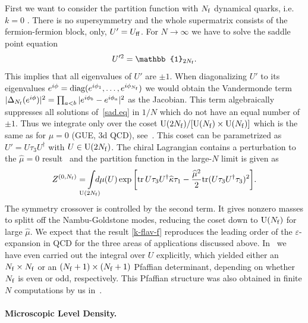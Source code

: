 \documentclass[aps,prl,reprint,graphicx,showpacs]{revtex4-1}
\newcommand{\tr}{\text{tr}}
\newcommand{\id}{\mathbb{1}}
\newcommand{\diag}{\text{diag}}
\newcommand{\U}{\text{U}}
\renewcommand{\epsilon}{\varepsilon}
\begin{document}
First we want to consider the partition function with $N_{\rm f}$ dynamical quarks, i.e. $k=0$ \cite{comm}. There is no supersymmetry and the whole supermatrix consists of the fermion-fermion block, only, $U'=U_{\rm ff}$. For $N\to\infty$ we have to solve the saddle point equation
\begin{equation}\label{sad.eq}
 U'^2=\id_{2N_{\rm f}}.
\end{equation}
This implies that all eigenvalues of $U'$ are $\pm1$. When diagonalizing $U'$ to its eigenvalues $e^{i \phi}=\diag(e^{i \phi_1},\ldots,e^{i \phi_{N_{\rm f}}})$ we would obtain the Vandermonde term $|\Delta_{N_{\rm f}}(e^{i \phi})|^2=\prod_{a<b}|e^{i \phi_b}-e^{i \phi_a}|^2$ as the Jacobian. This term algebraically suppresses all solutions of~\eqref{sad.eq} in $1/N$ which do not have an equal number of $\pm1$. Thus we integrate only over the coset ${\rm U}(2N_{\rm f})/[{\rm U}(N_{\rm f})\times {\rm U}(N_{\rm f})]$ which is the same as for $\mu=0$ (GUE, 3d QCD), see~\cite{Verbaarschot:1994ip}. This coset can be parametrized as $U'=U\tau_3 U^\dagger$ with $U\in{\rm U}(2N_{\rm f})$. The chiral Lagrangian contains a perturbation to the $\widehat{\mu}=0$ result~\cite{Verbaarschot:1994ip,Szabo:2005gi} and the partition function in the large-$N$ limit is given as
\begin{align}\label{k-flav-f}
Z^{(0,N_{\rm f})}=\!\!\!\!\! \int\limits_{\U(2N_{\rm f})} \!\!\!\!\!\!
d\mu(U)\exp\left[\tr\,U\tau_3U^\dagger \widehat{\kappa}\tau_1-\frac{\widehat{\mu}^2}{2}\tr(U\tau_3U^\dagger\tau_3)^2\right]\!.
\end{align}
The symmetry crossover is controlled by the second term. It gives nonzero masses to splitt off the Nambu-Goldstone modes, reducing the coset down to $\U(N_{\rm f})$ for large $\widehat{\mu}$. We expect that the result \eqref{k-flav-f} reproduces the leading order of the $\epsilon$-expansion in QCD for the three areas of applications discussed above. In~\cite{Kanazawa:2018b} we have even carried out the integral over $U$ explicitly, which yielded either an $N_{\rm f}\times N_{\rm f}$ or an $(N_{\rm f}+1)\times(N_{\rm f}+1)$ Pfaffian determinant, depending on whether $N_{\rm f}$ is even or odd, respectively. This Pfaffian structure was also obtained in finite $N$ computations by us in~\cite{Kanazawa:2018a}.

\paragraph{Microscopic Level Density.}
\end{document}
